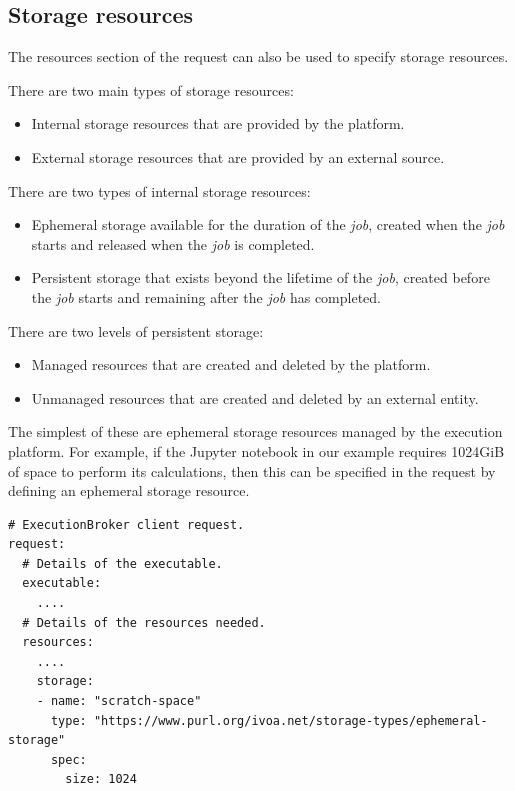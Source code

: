 \documentclass[11pt,a4paper]{ivoa}
\newcommand{\jupyternotebook} {Jupyter notebook}
\newcommand{\job} {\textit{job}}
\begin{document}
\subsection{Storage resources}
\label{storage-resources}

The resources section of the request can also be used to specify storage resources.

There are two main types of storage resources:
\begin{itemize}
    \item Internal storage resources that are provided by the platform.
    \item External storage resources that are provided by an external source.
\end{itemize}

There are two types of internal storage resources:
\begin{itemize}
    \item Ephemeral storage available for the duration of the \job{}, created when the \job{} starts and released when the \job{} is completed.
    \item Persistent storage that exists beyond the lifetime of the \job{}, created before the \job{} starts and remaining after the \job{} has completed.
\end{itemize}

There are two levels of persistent storage:
\begin{itemize}
    \item Managed resources that are created and deleted by the platform.
    \item Unmanaged resources that are created and deleted by an external entity.
\end{itemize}

The simplest of these are ephemeral storage resources managed by the execution platform.
For example, if the \jupyternotebook{} in our example requires 1024GiB of space to perform its calculations,
then this can be specified in the request by defining an ephemeral storage resource.

\begin{lstlisting}[]
# ExecutionBroker client request.
request:
  # Details of the executable.
  executable:
    ....
  # Details of the resources needed.
  resources:
    ....
    storage:
    - name: "scratch-space"
      type: "https://www.purl.org/ivoa.net/storage-types/ephemeral-storage"
      spec:
        size: 1024
\end{lstlisting}
\end{document}
